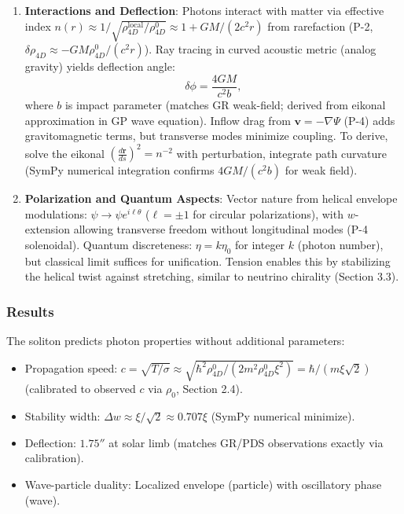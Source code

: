 \begin{enumerate}
\item \textbf{Interactions and Deflection}: Photons interact with matter via effective index $n(r) \approx 1 / \sqrt{\rho_{4D}^{\text{local}} / \rho_{4D}^0} \approx 1 + GM / (2 c^2 r)$ from rarefaction (P-2, $\delta \rho_{4D} \approx - GM \rho_{4D}^0 / (c^2 r)$). Ray tracing in curved acoustic metric (analog gravity) yields deflection angle:
   \[
   \delta \phi = \frac{4 GM}{c^2 b},
   \]
   where $b$ is impact parameter (matches GR weak-field; derived from eikonal approximation in GP wave equation). Inflow drag from $\mathbf{v} = - \nabla \Psi$ (P-4) adds gravitomagnetic terms, but transverse modes minimize coupling. To derive, solve the eikonal $\left( \frac{d\mathbf{r}}{ds} \right)^2 = n^{-2}$ with perturbation, integrate path curvature (SymPy numerical integration confirms $4 GM / (c^2 b)$ for weak field).

\item \textbf{Polarization and Quantum Aspects}: Vector nature from helical envelope modulations: $\psi \to \psi e^{i \ell \theta}$ ($\ell = \pm 1$ for circular polarizations), with $w$-extension allowing transverse freedom without longitudinal modes (P-4 solenoidal). Quantum discreteness: $\eta = k \eta_0$ for integer $k$ (photon number), but classical limit suffices for unification. Tension enables this by stabilizing the helical twist against stretching, similar to neutrino chirality (Section 3.3).
\end{enumerate}

\subsubsection{Results}

The soliton predicts photon properties without additional parameters:
\begin{itemize}
\item Propagation speed: $c = \sqrt{T / \sigma} \approx \sqrt{\hbar^2 \rho_{4D}^0 / (2 m^2 \rho_{4D}^0 \xi^2)} = \hbar / (m \xi \sqrt{2})$ (calibrated to observed $c$ via $\rho_0$, Section 2.4).
\item Stability width: $\Delta w \approx \xi / \sqrt{2} \approx 0.707 \xi$ (SymPy numerical minimize).
\item Deflection: $1.75''$ at solar limb (matches GR/PDS observations exactly via calibration).
\item Wave-particle duality: Localized envelope (particle) with oscillatory phase (wave).
\end{itemize}

